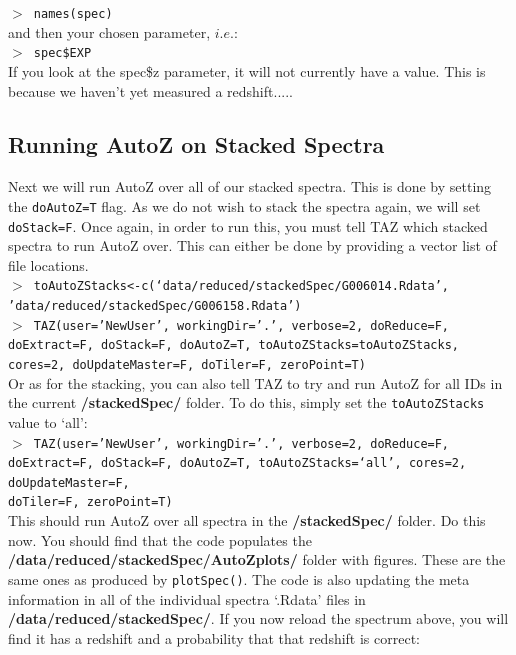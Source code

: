 \documentclass[12pt]{article}
\begin{document}
 \hspace{10mm} \texttt{$>$ names(spec)} \\
 
 and then your chosen parameter, $i.e.$:\\
 
 
  \hspace{10mm} \texttt{$>$ spec\$EXP} \\
  
 If you look at the spec\$z parameter, it will not currently have a value. This is because we haven't yet measured a redshift.....
 

 \subsection{Running AutoZ on Stacked Spectra}
 
 Next we will run AutoZ over all of our stacked spectra. This is done by setting the \texttt{doAutoZ=T} flag. As we do not wish to stack the spectra again, we will set \texttt{doStack=F}. Once again, in order to run this, you must tell TAZ which stacked spectra to run AutoZ over. This can either be done by providing a vector list of file locations. \\
 
 \hspace{10mm} \texttt{$>$ toAutoZStacks<-c(`data/reduced/stackedSpec/G006014.Rdata',  \\ 'data/reduced/stackedSpec/G006158.Rdata')}\\
 
 \hspace{10mm} \texttt{$>$ TAZ(user='NewUser', workingDir='.', verbose=2, doReduce=F, doExtract=F, doStack=F,  doAutoZ=T, toAutoZStacks=toAutoZStacks, cores=2, doUpdateMaster=F, doTiler=F, zeroPoint=T)}\\ 
 
Or as for the stacking, you can also tell TAZ to try and run AutoZ for all IDs in the current \textbf{/stackedSpec/} folder. To do this, simply set the \texttt{toAutoZStacks} value to `all': \\
  

  \hspace{10mm} \texttt{$>$ TAZ(user='NewUser', workingDir='.', verbose=2, doReduce=F, doExtract=F, doStack=F, doAutoZ=T,  toAutoZStacks=`all',  cores=2, doUpdateMaster=F, \\ doTiler=F, zeroPoint=T)}\\  
  
This should run AutoZ over all spectra in the \textbf{/stackedSpec/} folder. Do this now. You should find that the code populates the \textbf{/data/reduced/stackedSpec/AutoZplots/} folder with figures. These are the same ones as produced by \texttt{plotSpec()}. The code is also updating the meta information in all of the individual spectra `.Rdata' files in \textbf{/data/reduced/stackedSpec/}. If you now reload the spectrum above, you will find it has a redshift and a probability that that redshift is correct:\\  
\end{document}
